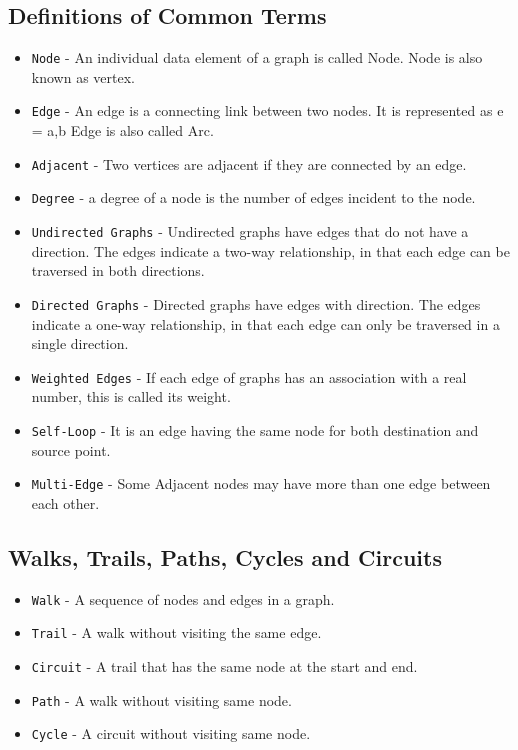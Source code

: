 \documentclass[12pt]{article}
\begin{document}
    \subsection{Definitions of Common Terms}
        \begin{itemize}
          \item \texttt{Node} - An individual data element of a graph is called Node. Node is also known as vertex.
          \item \texttt{Edge} - An edge is a connecting link between two nodes. It is represented as e = {a,b} Edge is also called Arc. 
          \item \texttt{Adjacent} - Two vertices are adjacent if they are connected by an edge.
          \item \texttt{Degree} - a degree of a node is the number of edges incident to the node.  
          \item \texttt{Undirected Graphs} - Undirected graphs have edges that do not have a direction. The edges indicate a two-way relationship, in that each edge can be traversed in both directions.  
          \item \texttt{Directed Graphs} - Directed graphs have edges with direction. The edges indicate a one-way relationship, in that each edge can only be traversed in a single direction.  
          \item \texttt{Weighted Edges} - If each edge of graphs has an association with a real number, this is called its weight. 
          \item \texttt{Self-Loop} - It is an edge having the same node for both destination and source point.
          \item \texttt{Multi-Edge} - Some Adjacent nodes may have more than one edge between each other.
          
    
        \end{itemize}
        \newpage
    \subsection{Walks, Trails, Paths, Cycles and Circuits}
        \begin{itemize}
          \item \texttt{Walk} - A sequence of nodes and edges in a graph.
          
          \item \texttt{Trail} - A walk without visiting the same edge.
          
          \item \texttt{Circuit} - A trail that has the same node at the start and end.
          
          \item \texttt{Path} - A walk without visiting same node.
          
          \item \texttt{Cycle} - A circuit without visiting same node. 
          
        \end{itemize}
\end{document}
